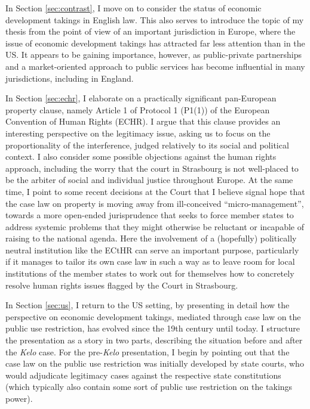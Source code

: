 In Section \ref{sec:contrast}, I move on to consider the status of economic development takings in  English law. This also serves to introduce the topic of my thesis from the point of view of an important jurisdiction in Europe, where the issue of economic development takings has attracted far less attention than in the US. It appears to be gaining importance, however, as public-private partnerships and a market-oriented approach to public services has become influential in many jurisdictions, including in England.

In Section \ref{sec:echr}, I elaborate on a practically significant pan-European property clause, namely Article 1 of Protocol 1 (P1(1)) of the European Convention of Human Rights (ECHR). I argue that this clause provides an interesting perspective on the legitimacy issue, asking us to focus on the proportionality of the interference, judged relatively to its social and political context. I also consider some possible objections against the human rights approach, including the worry that the court in Strasbourg is not well-placed to be the arbiter of social and individual justice throughout Europe. At the same time, I point to some recent decisions at the Court that I believe signal hope that the case law on property is moving away from ill-conceived ``micro-management'', towards a more open-ended jurisprudence that seeks to force member states to address systemic problems that they might otherwise be reluctant or incapable of raising to the national agenda. Here the involvement of a (hopefully) politically neutral institution like the ECtHR can serve an important purpose, particularly if it manages to tailor its own case law in such a way as to leave room for local institutions of the member states to work out for themselves how to concretely resolve human rights issues flagged by the Court in Strasbourg.

In Section \ref{sec:us}, I return to the US setting, by presenting in detail how the perspective on economic development takings, mediated through case law on the public use restriction, has evolved since the 19th century until today. I structure the presentation as a story in two parts, describing the situation before and after the {\it Kelo} case. For the pre-{\it Kelo} presentation, I begin by pointing out that the case law on the public use restriction was initially developed by state courts, who would adjudicate legitimacy cases against the respective state constitutions (which typically also contain some sort of public use restriction on the takings power). 

